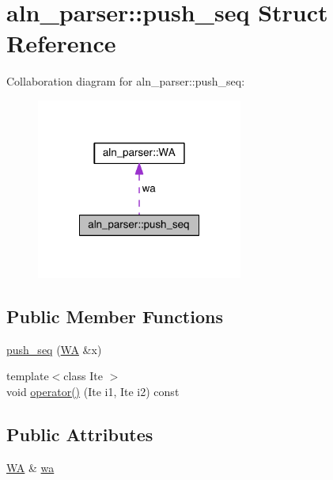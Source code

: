 \hypertarget{structaln__parser_1_1push__seq}{\section{aln\+\_\+parser\+:\+:push\+\_\+seq Struct Reference}
\label{structaln__parser_1_1push__seq}
}


Collaboration diagram for aln\+\_\+parser\+:\+:push\+\_\+seq\+:
\nopagebreak
\begin{figure}[H]
\begin{center}
\leavevmode
\includegraphics[width=192pt]{structaln__parser_1_1push__seq__coll__graph}
\end{center}
\end{figure}
\subsection*{Public Member Functions}
\begin{DoxyCompactItemize}
\item 
\hyperlink{structaln__parser_1_1push__seq_a9ab0bb8792a7a7998adf3a9be1febd32}{push\+\_\+seq} (\hyperlink{structaln__parser_1_1_w_a}{W\+A} \&x)
\item 
{\footnotesize template$<$class Ite $>$ }\\void \hyperlink{structaln__parser_1_1push__seq_ab01c80038e8e0ca0efae5faac8ef3b61}{operator()} (Ite i1, Ite i2) const 
\end{DoxyCompactItemize}
\subsection*{Public Attributes}
\begin{DoxyCompactItemize}
\item 
\hyperlink{structaln__parser_1_1_w_a}{W\+A} \& \hyperlink{structaln__parser_1_1push__seq_af9e4d77c206f25d1ad680fbe32dbafdf}{wa}
\end{DoxyCompactItemize}


